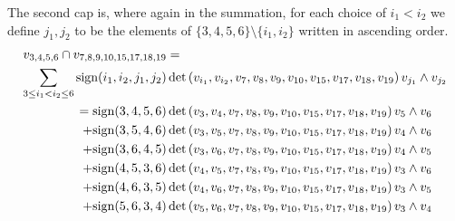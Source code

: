 \documentclass[ALCO, Unicode]{cedram}
\numberwithin{equation}{section}
\begin{document}
\begin{example}
The second cap is, where again in the summation, for each choice of $i_1 < i_2$ we define $j_1,j_{2}$ to be the elements of $\{3,4,5,6\} \setminus \{i_1,i_2\}$ written in ascending order. 
\begin{align*}
v_{3,4,5,6} \cap v_{7,8,9,10,15,17,18,19} &= \\ \sum_{3\leq i_1 < i_2\leq 6} {\rm sign}(i_1,i_2,j_1,j_2) &\det\left(v_{i_1},v_{i_2}, v_{7}, v_{8}, v_{9}, v_{10}, v_{15}, v_{17}, v_{18}, v_{19}\right)v_{j_1} \wedge v_{j_{2}}\nonumber \\
= {\rm sign}(3,4,5,6) &\det\left(v_3,v_4, v_{7}, v_{8}, v_{9}, v_{10}, v_{15}, v_{17}, v_{18}, v_{19}\right)v_5 \wedge  v_6 \nonumber \\
+ {\rm sign}(3,5,4,6) &\det\left(v_{3},v_5, v_7, v_8, v_9, v_{10}, v_{15}, v_{17}, v_{18}, v_{19}\right)v_4 \wedge v_6 \nonumber \\
+ {\rm sign}(3,6,4,5) &\det\left(v_3,v_6, v_7, v_8, v_9, v_{10}, v_{15}, v_{17}, v_{18}, v_{19}\right)v_4 \wedge v_5 \nonumber \\
+ {\rm sign}(4,5,3,6) &\det\left(v_4,v_5,v_7, v_8, v_9, v_{10}, v_{15}, v_{17}, v_{18}, v_{19}\right)v_3 \wedge v_6 \nonumber \\
+ {\rm sign}(4,6,3,5) &\det\left(v_4,v_6,v_7, v_8, v_9, v_{10}, v_{15}, v_{17}, v_{18}, v_{19}\right)v_3 \wedge v_5 \nonumber \\
+ {\rm sign}(5,6,3,4) &\det\left(v_5,v_6,v_7, v_8, v_9, v_{10}, v_{15}, v_{17}, v_{18}, v_{19}\right) v_3 \wedge v_4 \nonumber
\end{align*}



\end{example}
\end{document}
